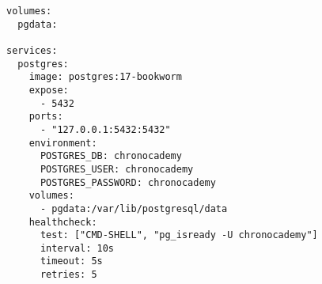 \begin{verbatim}
volumes:
  pgdata:

services:
  postgres:
    image: postgres:17-bookworm
    expose:
      - 5432
    ports:
      - "127.0.0.1:5432:5432"
    environment:
      POSTGRES_DB: chronocademy
      POSTGRES_USER: chronocademy
      POSTGRES_PASSWORD: chronocademy
    volumes:
      - pgdata:/var/lib/postgresql/data
    healthcheck:
      test: ["CMD-SHELL", "pg_isready -U chronocademy"]
      interval: 10s
      timeout: 5s
      retries: 5
\end{verbatim}
